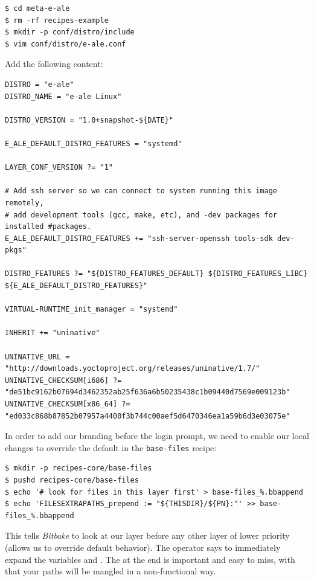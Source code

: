 \documentclass[a4paper,12pt,obeyspaces,spaces,hyphens]{article}
\newcommand{\code}[1]
{\path{#1}}
\begin{document}
\begin{verbatim}
$ cd meta-e-ale
$ rm -rf recipes-example
$ mkdir -p conf/distro/include
$ vim conf/distro/e-ale.conf
\end{verbatim}

Add the following content:
\begin{tcolorbox}[enhanced jigsaw,colback=bg,boxrule=0pt,arc=0pt]
\begin{verbatim}
DISTRO = "e-ale"
DISTRO_NAME = "e-ale Linux"

DISTRO_VERSION = "1.0+snapshot-${DATE}"

E_ALE_DEFAULT_DISTRO_FEATURES = "systemd"

LAYER_CONF_VERSION ?= "1"

# Add ssh server so we can connect to system running this image remotely,
# add development tools (gcc, make, etc), and -dev packages for installed #packages.
E_ALE_DEFAULT_DISTRO_FEATURES += "ssh-server-openssh tools-sdk dev-pkgs"

DISTRO_FEATURES ?= "${DISTRO_FEATURES_DEFAULT} ${DISTRO_FEATURES_LIBC} ${E_ALE_DEFAULT_DISTRO_FEATURES}"

VIRTUAL-RUNTIME_init_manager = "systemd"

INHERIT += "uninative"

UNINATIVE_URL = "http://downloads.yoctoproject.org/releases/uninative/1.7/"
UNINATIVE_CHECKSUM[i686] ?= "de51bc9162b07694d3462352ab25f636a6b50235438c1b09440d7569e009123b"
UNINATIVE_CHECKSUM[x86_64] ?= "ed033c868b87852b07957a4400f3b744c00aef5d6470346ea1a59b6d3e03075e"
\end{verbatim}
\end{tcolorbox}

In order to add our branding before the login prompt, we need to enable our local changes to override the default in the \texttt{base-files} recipe:

\begin{verbatim}
$ mkdir -p recipes-core/base-files
$ pushd recipes-core/base-files
$ echo '# look for files in this layer first' > base-files_%.bbappend
$ echo 'FILESEXTRAPATHS_prepend := "${THISDIR}/${PN}:"' >> base-files_%.bbappend
\end{verbatim}

This tells {\em Bitbake} to look at our \code{meta-e-ale-distro} layer before any other layer of lower priority (allows us to override default behavior). The \code{:=} operator says to immediately expand the variables \code{${THISDIR}} and \code{${PN}}. The \code{:} at the end is important and easy to miss, with that your paths will be mangled in a non-functional way.
\end{document}
